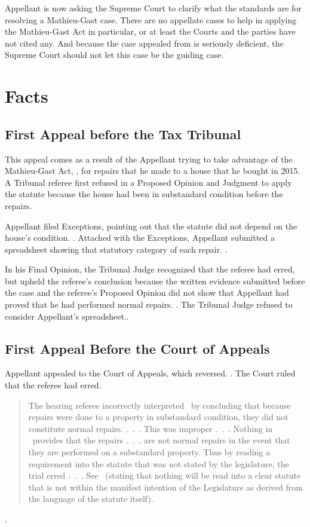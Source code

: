\documentclass[12pt,\documentclassflag]{michiganCourtOfAppealsBrief}
\begin{document}
Appellant is now asking the Supreme Court to clarify what the standards are for resolving a Mathieu-Gast case. There are no  appellate cases to help in applying the Mathieu-Gast Act in particular, or at least the Courts and the parties have not cited any. And because the case appealed from is seriously deficient, the Supreme Court should not let this case be the guiding case.

\section{Facts}

\subsection{First Appeal before the Tax Tribunal}

This appeal comes as a result of the Appellant trying to take advantage of the Mathieu-Gast Act, \mathieuGast,
for repairs that he made to a house that he bought in 2015. A Tribunal referee first refused in a Proposed Opinion and Judgment to apply the statute because the house had been in substandard condition before the repairs.

Appellant filed Exceptions, pointing out that the statute did not depend on the house's condition. . Attached with the Exceptions, Appellant submitted a spreadsheet showing that statutory category of each repair. .

In his Final Opinion, the Tribunal Judge recognized that the referee had erred, but upheld the referee's conclusion because the written evidence submitted before the case and the referee's Proposed Opinion did not show that Appellant had proved that he had performed normal repairs. . The Tribunal Judge refused to consider Appellant's spreadsheet..

\subsection{First Appeal Before the Court of Appeals}

Appellant appealed to the Court of Appeals, which reversed. \cite{Patru 1}. The Court ruled that the referee had erred.

\begin{quote}
  The hearing referee incorrectly interpreted \mathieuGast\ by concluding that because repairs were done to a property in substandard condition, they did not constitute normal repairs. .~.~. This was improper .~.~. Nothing in \mathieuGast\ provides that the repairs .~.~. are not normal repairs in the event that they are performed on a substandard property. Thus by reading a requirement into the statute that was not stated by the legislature, the trial erred .~.~. See \ (stating that nothing will be read into a clear statute that is not within the manifest intention of the Legislature as derived from the language of the statute itself).
\end{quote}
.
\end{document}
